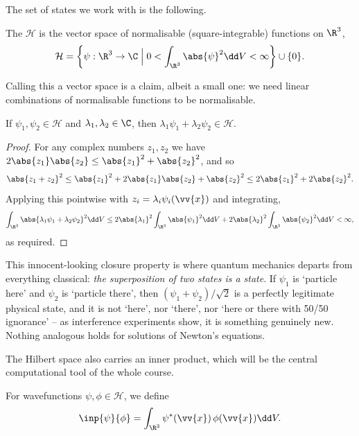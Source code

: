The set of states we work with is the following.

\begin{definition}
    The  $\mathcal{H}$ is the vector space of normalisable (square-integrable) functions on $\R^3$,
    $$
    \mathcal{H} = \left\{ \psi : \R^3 \rightarrow \C \;\Big|\; 0 < \int_{\R^3} \abs{\psi}^2 \dd V < \infty \right\} \cup \{0\}.
    $$
\end{definition}

Calling this a vector space is a claim, albeit a small one: we need linear combinations of normalisable functions to be normalisable.

\begin{proposition}
    If $\psi_1, \psi_2 \in \mathcal{H}$ and $\lambda_1, \lambda_2 \in \C$, then $\lambda_1 \psi_1 + \lambda_2 \psi_2 \in \mathcal{H}$.
\end{proposition}
\begin{proof}
    For any complex numbers $z_1, z_2$ we have $2\abs{z_1}\abs{z_2} \leq \abs{z_1}^2 + \abs{z_2}^2$, and so
    $$
    \abs{z_1 + z_2}^2 \leq \abs{z_1}^2 + 2 \abs{z_1} \abs{z_2} + \abs{z_2}^2 \leq 2\abs{z_1}^2 + 2\abs{z_2}^2.
    $$
    Applying this pointwise with $z_i = \lambda_i \psi_i(\vv{x})$ and integrating,
    $$
    \int_{\R^3} \abs{\lambda_1 \psi_1 + \lambda_2 \psi_2}^2 \dd V \leq 2 \abs{\lambda_1}^2 \int_{\R^3} \abs{\psi_1}^2 \dd V + 2 \abs{\lambda_2}^2 \int_{\R^3} \abs{\psi_2}^2 \dd V < \infty,
    $$
    as required.
\end{proof}

This innocent-looking closure property is where quantum mechanics departs from everything classical: \emph{the superposition of two states is a state}. If $\psi_1$ is `particle here' and $\psi_2$ is `particle there', then $(\psi_1 + \psi_2)/\sqrt{2}$ is a perfectly legitimate physical state, and it is not `here', nor `there', nor `here or there with 50/50 ignorance' -- as interference experiments show, it is something genuinely new. Nothing analogous holds for solutions of Newton's equations.

The Hilbert space also carries an inner product, which will be the central computational tool of the whole course.

\begin{definition}
    For wavefunctions $\psi, \phi \in \mathcal{H}$, we define
    $$
    \inp{\psi}{\phi} = \int_{\R^3} \psi^* (\vv{x}) \, \phi(\vv{x}) \dd V.
    $$
\end{definition}

